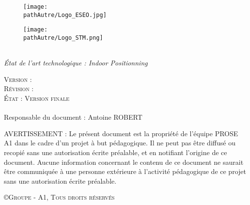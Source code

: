 

\makeatletter
    \begin{titlepage}
    \centering
        \begin{figure}[H]
            \begin{minipage}[c]{.46\linewidth}
                \centering
                \texttt{[image: \\pathAutre/Logo\_ESEO.jpg]}
            \end{minipage}
            \hfill%
            \begin{minipage}[c]{.46\linewidth}
                \centering
                \texttt{[image: \\pathAutre/Logo\_STM.png]}
            \end{minipage}
        \end{figure}


\vspace{1cm}
\vfill
        {\Huge \textbf{\@title}} \\
        \vspace{1em}
        {\Large \textsl{État de l'art technologique : Indoor Positionning}}\\
    \vspace{4em}
    \begin{flushleft}
        {\LARGE \textsc{Version : \VersionDocument\\
                     Révision : \RevisionDocument\\
                     État : Version finale\\}
            \vspace{2em}    
        \@author\\
        Responsable du document : Antoine ROBERT\       
        }        
        
    \end{flushleft}


\begin{flushleft}
AVERTISSEMENT : Le présent document est la propriété de l’équipe PROSE A1 dans le cadre d’un projet à but pédagogique. Il ne peut pas être diffusé ou recopié sans une autorisation écrite préalable, et en notifiant l’origine de ce document. Aucune information concernant le contenu de ce document ne saurait être communiquée à une personne extérieure à l’activité pédagogique de ce projet sans une autorisation écrite préalable.
\end{flushleft}
        
\vfill
        {\Large \textsc{\copyright Groupe - A1, Tous droits réservés}} \\
    \end{titlepage}
\makeatother

